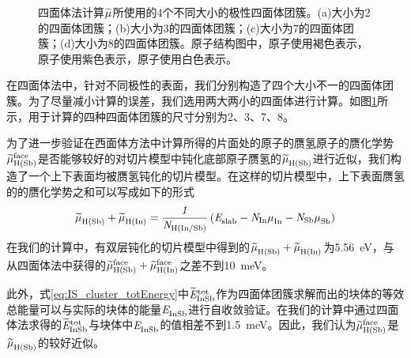 \begin{figure}[htb]
{    }
    \caption{四面体法计算$\it \widetilde{\mu}_{\rm }^{\rm } \it$所使用的4个不同大小的极性四面体团簇。(a)大小为2的四面体团簇；(b)大小为3的四面体团簇；(c)大小为7的四面体团簇；(d)大小为8的四面体团簇。原子结构图中，原子使用褐色表示，原子使用紫色表示，原子使用白色表示。}
    \label{fig:IS_structure_cluster}
\end{figure}

在四面体法中，针对不同极性的表面，我们分别构造了四个大小不一的四面体团簇。为了尽量减小计算的误差，我们选用两大两小的四面体进行计算。如图\ref{fig:IS_structure_cluster}所示，用于计算的四种四面体团簇的尺寸分别为2、3、7、8。

为了进一步验证在西面体方法中计算所得的片面处的原子的赝氢原子的赝化学势$\it \widetilde{\mu}_{\rm H\left(Sb\right)}^{\rm face} \it$是否能够较好的对切片模型中钝化底部原子赝氢的$\it \widetilde{\mu}_{\rm H\left(Sb\right)}^{\rm } \it$进行近似，我们构造了一个上下表面均被赝氢钝化的切片模型。在这样的切片模型中，上下表面赝氢的的赝化学势之和可以写成如下的形式\chinesecolon
\[
    \it \widetilde{\mu}_{\rm H\left(Sb\right)}^{\rm } \it+\it \widetilde{\mu}_{\rm H\left(In\right)}^{\rm } \it=\frac{1}{N_{\rm H \left(In/ Sb\right)}} \left(\it E_{\rm slab}^{\rm } \it-N_{\rm In}\it \mu_{\rm In}^{\rm } \it-N_{\rm Sb}\it \mu_{\rm Sb}^{\rm } \it\right)
    \]
在我们的计算中，有双层钝化的切片模型中得到的$\it \widetilde{\mu}_{\rm H\left(Sb\right)}^{\rm } \it+\it \widetilde{\mu}_{\rm H\left(In\right)}^{\rm } \it$为\SI{5.56}{\electronvolt}，与从四面体法中获得的$\it \widetilde{\mu}_{\rm H\left(Sb\right)}^{\rm face} \it+\it \widetilde{\mu}_{\rm H\left(In\right)}^{\rm face} \it$之差不到\SI{10}{\milli\electronvolt}。

此外，式\ref{eq:IS_cluster_totEnergy}中$\it \widetilde{E}_{\rm InSb}^{\rm tot} \it$作为四面体团簇求解而出的块体的等效总能量可以与实际的块体的能量$\it E_{\rm InSb}^{\rm } \it$进行自收敛验证。在我们的计算中通过四面体法求得的$\it \widetilde{E}_{\rm InSb}^{\rm tot} \it$与块体中$\it E_{\rm InSb}^{\rm } \it$的值相差不到\SI{1.5}{\milli\electronvolt}。因此，我们认为$\it \widetilde{\mu}_{\rm H\left(Sb\right)}^{\rm face} \it$是$\it \widetilde{\mu}_{\rm H\left(Sb\right)}^{\rm } \it$的较好近似。

